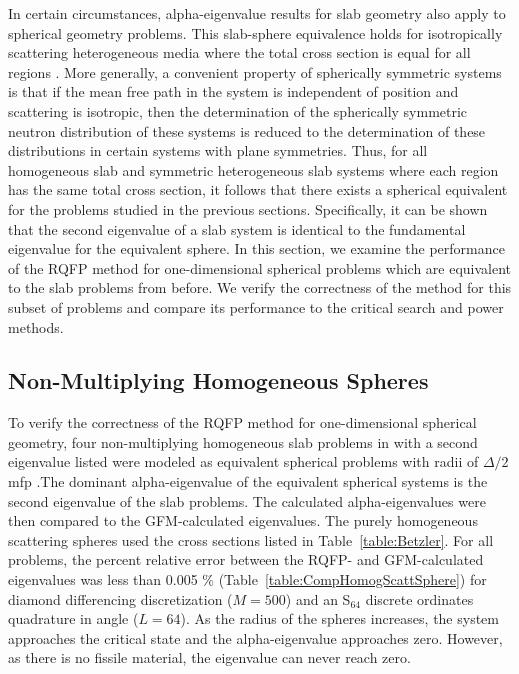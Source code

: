 In certain circumstances, alpha-eigenvalue results for slab geometry also apply to spherical geometry problems. This slab-sphere equivalence holds for isotropically scattering heterogeneous media where the total cross section is equal for all regions \cite{davison1957neutron}. More generally, a convenient property of spherically symmetric systems is that if the mean free path in the system is independent of position and scattering is isotropic, then the determination of the spherically symmetric neutron distribution of these systems is reduced to the determination of these distributions in certain systems with plane symmetries. Thus, for all homogeneous slab and symmetric heterogeneous slab systems where each region has the same total cross section, it follows that there exists a spherical equivalent for the problems studied in the previous sections. Specifically, it can be shown that the second eigenvalue of a slab system is identical to the fundamental eigenvalue for the equivalent sphere. In this section, we examine the performance of the RQFP method for one-dimensional spherical problems which are equivalent to the slab problems from before. We verify the correctness of the method for this subset of problems and compare its performance to the critical search and power methods.

\subsection{Non-Multiplying Homogeneous Spheres}

To verify the correctness of the RQFP method for one-dimensional spherical geometry, four non-multiplying homogeneous slab problems in \cite{kornreich_greens_1997} with a second eigenvalue listed were modeled as equivalent spherical problems with radii of $\Delta/2$ mfp \cite{}.The dominant alpha-eigenvalue of the equivalent spherical systems is the second eigenvalue of the slab problems. The calculated alpha-eigenvalues were then compared to the GFM-calculated eigenvalues. The purely homogeneous scattering spheres used the cross sections listed in Table~\ref{table:Betzler}. For all problems, the percent relative error between the RQFP- and GFM-calculated eigenvalues was less than 0.005 \% (Table~\ref{table:CompHomogScattSphere}) for diamond differencing discretization ($M=500$) and an S$_{64}$ discrete ordinates quadrature in angle ($L=64$). As the radius of the spheres increases, the system approaches the critical state and the alpha-eigenvalue approaches zero. However, as there is no fissile material, the eigenvalue can never reach zero.

